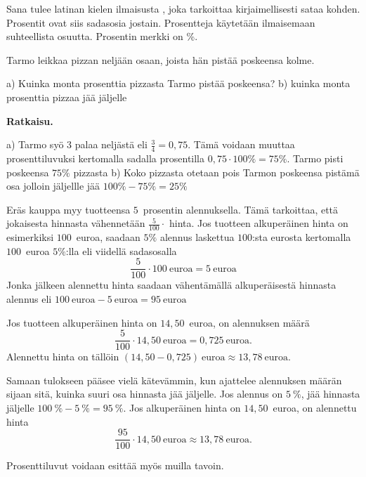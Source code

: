 Sana  tulee latinan kielen ilmaisusta ,
joka tarkoittaa kirjaimellisesti sataa kohden. 
Prosentit ovat siis sadasosia jostain.
Prosentteja käytetään ilmaisemaan suhteellista osuutta.
Prosentin merkki on \%.


\begin{esimerkki}
Tarmo leikkaa pizzan neljään osaan, joista hän pistää poskeensa kolme.

a) Kuinka monta prosenttia pizzasta Tarmo pistää poskeensa?
\newline b) kuinka monta prosenttia pizzaa jää jäljelle

\textbf{Ratkaisu.}

a) Tarmo syö 3 palaa neljästä eli $\frac{3}{4} = 0,75$. Tämä voidaan muuttaa prosenttiluvuksi kertomalla sadalla prosentilla $0,75 \cdot 100\% = 75\%$. Tarmo pisti poskeensa $75\%$ pizzasta
\newline b) Koko pizzasta otetaan pois Tarmon poskeensa pistämä osa jolloin jäljellle jää $100\% - 75\% = 25\%$
\end{esimerkki}


\begin{esimerkki}
Eräs kauppa myy tuotteensa $5$~prosentin alennuksella. Tämä tarkoittaa, että jokaisesta hinnasta vähennetään $\frac{5}{100} \cdot$ hinta. Jos tuotteen alkuperäinen hinta on esimerkiksi $100$~euroa, saadaan $5\%$ alennus laskettua $100$:sta eurosta kertomalla $100$~euroa $5\%$:lla eli viidellä sadasosalla 
\[
\frac{5}{100} \cdot 100~\text{euroa} = 5~\text{euroa}
\]
Jonka jälkeen alennettu hinta saadaan vähentämällä alkuperäisestä hinnasta alennus eli $100~\text{euroa} - 5~\text{euroa} = 95~\text{euroa}$

Jos tuotteen alkuperäinen hinta on $14,50$~euroa, on alennuksen määrä
\[
	\frac{5}{100} \cdot 14,50~\text{euroa} = 0,725~\text{euroa}.
\]
Alennettu hinta on tällöin $(14,50 - 0,725)~\text{euroa} \approx 13,78~\text{euroa}$.

Samaan tulokseen pääsee vielä kätevämmin, kun ajattelee alennuksen määrän sijaan sitä, kuinka suuri osa hinnasta jää jäljelle. Jos alennus on $5~\%$, jää hinnasta jäljelle $100~\% - 5~\% = 95~\%$. Jos alkuperäinen hinta on $14,50$~euroa, on alennettu hinta 
\[
	\frac{95}{100} \cdot 14,50~\text{euroa} \approx 13,78~\text{euroa}.
\]
\end{esimerkki}

\begin{esimerkki}
    Prosenttiluvut voidaan esittää myös muilla tavoin.
    \begin{alakohdat}
    \end{alakohdat}
\end{esimerkki}

